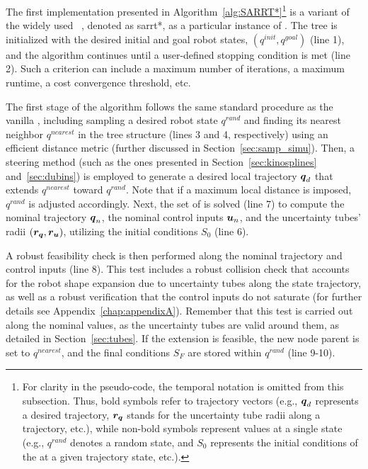 The first implementation presented in Algorithm~\ref{alg:SARRT*}\footnote{For clarity in the pseudo-code, the temporal notation is omitted from this subsection. 
Thus, bold symbols refer to trajectory vectors (e.g., $\boldsymbol{q}_d$ represents a desired trajectory, $\boldsymbol{r_q}$ stands for the uncertainty tube radii along a trajectory, etc.), while non-bold symbols represent values at a single state (e.g., $q^{rand}$ denotes a random state, and $S_0$ represents the initial conditions of the  at a given trajectory state, etc.).} is a variant of the widely used ~\cite{cRRTstar}, denoted as \gls{sarrt*}, as a particular instance of .
The tree is initialized with the desired initial and goal robot states, $(q^{init}, q^{goal})$ (line 1), and the algorithm continues until a user-defined stopping condition is met (line 2).
Such a criterion can include a maximum number of iterations, a maximum runtime, a cost convergence threshold, etc.

The first stage of the algorithm follows the same standard procedure as the vanilla , including sampling a desired robot state $q^{rand}$ and finding its nearest neighbor $q^{nearest}$ in the tree structure (lines 3 and 4, respectively) using an efficient distance metric (further discussed in Section~\ref{sec:samp_simu}).
Then, a steering method (such as the ones presented in Section~\ref{sec:kinosplines} and~\ref{sec:dubins}) is employed to generate a desired local trajectory $\boldsymbol{q}_d$ that extends $q^{nearest}$ toward $q^{rand}$.
Note that if a maximum local distance is imposed, $q^{rand}$ is adjusted accordingly.
Next, the set of  is solved (line 7) to compute the nominal trajectory $\boldsymbol{q}_n$, the nominal control inputs $\boldsymbol{u}_n$, and the uncertainty tubes' radii $(\boldsymbol{r_q}, \boldsymbol{r_u})$, utilizing the initial conditions $S_0$ (line 6).

A robust feasibility check is then performed along the nominal trajectory and control inputs (line 8).
This test includes a robust collision check that accounts for the robot shape expansion due to uncertainty tubes along the state trajectory, as well as a robust verification that the control inputs do not saturate (for further details see Appendix~\ref{chap:appendixA}).
Remember that this test is carried out along the nominal values, as the uncertainty tubes are valid around them, as detailed in Section~\ref{sec:tubes}.
If the extension is feasible, the new node parent is set to $q^{nearest}$, and the final conditions $S_F$ are stored within $q^{rand}$ (line 9-10).

